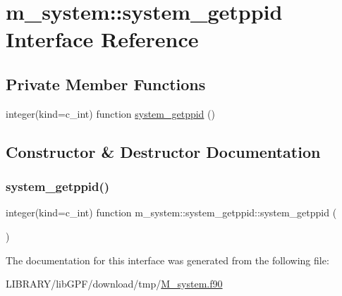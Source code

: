 \hypertarget{interfacem__system_1_1system__getppid}{}\section{m\+\_\+system\+:\+:system\+\_\+getppid Interface Reference}
\label{interfacem__system_1_1system__getppid}
\subsection*{Private Member Functions}
\begin{DoxyCompactItemize}
\item 
integer(kind=c\+\_\+int) function \hyperlink{interfacem__system_1_1system__getppid_af6e12ecb746ff59fbe323d9364db41b0}{system\+\_\+getppid} ()
\end{DoxyCompactItemize}


\subsection{Constructor \& Destructor Documentation}
\mbox{\label{interfacem__system_1_1system__getppid_af6e12ecb746ff59fbe323d9364db41b0}} 
\subsubsection{\texorpdfstring{system\+\_\+getppid()}{system\_getppid()}}
{\footnotesize\ttfamily integer(kind=c\+\_\+int) function m\+\_\+system\+::system\+\_\+getppid\+::system\+\_\+getppid (\begin{DoxyParamCaption}{ }\end{DoxyParamCaption})\hspace{0.3cm}{\ttfamily [private]}}



The documentation for this interface was generated from the following file\+:\begin{DoxyCompactItemize}
\item 
L\+I\+B\+R\+A\+R\+Y/lib\+G\+P\+F/download/tmp/\hyperlink{M__system_8f90}{M\+\_\+system.\+f90}\end{DoxyCompactItemize}
